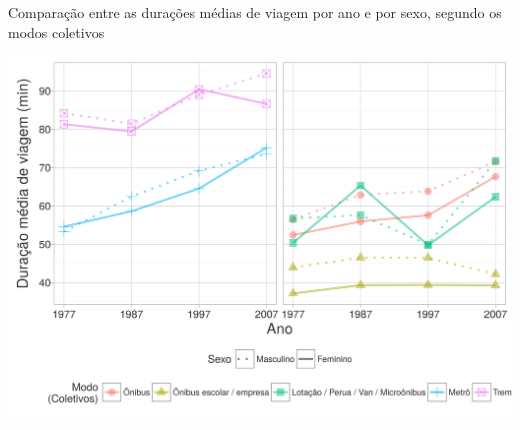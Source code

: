\begin{grafico}[htb]%
    \caption{\label{graf:duracao-coletivo}Comparação entre as durações médias de viagem por ano e por sexo, segundo os modos coletivos}%
    \begin{center}%
        \includegraphics[width=1\textwidth]{./imagens/duracao-coletivo.png}%
    \end{center}%
\end{grafico}%

